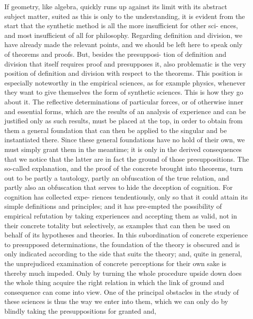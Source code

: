 If geometry, like algebra, quickly runs up against its limit with its abstract
subject matter, suited as this is only to the understanding, it is evident from
the start that the synthetic method is all the more insufficient for other sci-
ences, and most insufficient of all for philosophy. Regarding definition and
division, we have already made the relevant points, and we should be left
here to speak only of theorems and proofs. But, besides the presupposi-
tion of definition and division that itself requires proof and presupposes
it, also problematic is the very position of definition and division with
respect to the theorems. This position is especially noteworthy in the
empirical sciences, as for example physics, whenever they want to give
themselves the form of synthetic sciences. This is how they go about it.
The reflective determinations of particular forces, or of otherwise inner and
essential forms, which are the results of an analysis of experience and can be
justified only as such results, must be placed at the top, in order to obtain
from them a general foundation that can then be applied to the singular
and be instantiated there. Since these general foundations have no hold of
their own, we must simply grant them in the meantime; it is only in the
derived consequences that we notice that the latter are in fact the ground
of those presuppositions. The so-called explanation, and the proof of the
concrete brought into theorems, turn out to be partly a tautology, partly
an obfuscation of the true relation, and partly also an obfuscation that
serves to hide the deception of cognition. For cognition has collected expe-
riences tendentiously, only so that it could attain its simple definitions and
principles; and it has pre-empted the possibility of empirical refutation
by taking experiences and accepting them as valid, not in their concrete
totality but selectively, as examples that can then be used on behalf of its
hypotheses and theories. In this subordination of concrete experience to
presupposed determinations, the foundation of the theory is obscured and
is only indicated according to the side that suits the theory; and, quite in
general, the unprejudiced examination of concrete perceptions for their
own sake is thereby much impeded. Only by turning the whole procedure
upside down does the whole thing acquire the right relation in which the
link of ground and consequence can come into view. One of the principal
obstacles in the study of these sciences is thus the way we enter into them,
which we can only do by blindly taking the presuppositions for granted and,
